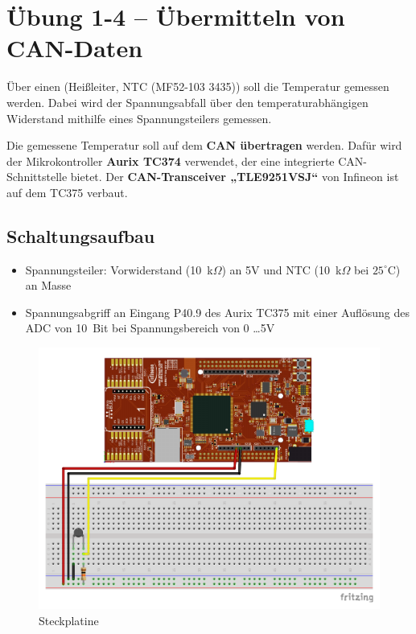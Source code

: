 \documentclass[
    fontsize=12pt,                      %
    paper=a4,                           %
    twoside=off,                       %
    DIV=15,                             %
    BCOR=12mm,                          %
    headings=normal,                    %
    headsepline=false,                   %
    footsepline=false,                  %
    headinclude=true,                   %
    footinclude=false,                  %
    toc=listof,                         %
    toc=bib,                            %
    chapterprefix=false,                %
    appendixprefix=false,               %
    numbers=noendperiod,                %
    captions=tableabove,                %
    footnotes=multiple,                 %
    bibliography=oldstyle,              %
    draft=false,                        %
]{scrreprt}
\begin{document}
\chapter*{Übung 1-4 -- Übermitteln von CAN-Daten}

Über einen  (Heißleiter, NTC (MF52-103 3435)) soll die Temperatur gemessen werden. Dabei wird der Spannungsabfall über den temperaturabhängigen Widerstand mithilfe eines Spannungsteilers gemessen.

\vskip 0.2cm
\noindent

Die gemessene Temperatur soll auf dem \textbf{CAN übertragen} werden. Dafür wird der Mikrokontroller \textbf{Aurix TC374} verwendet, der eine integrierte CAN-Schnittstelle bietet. Der \textbf{CAN-Transceiver „TLE9251VSJ“} von Infineon ist auf dem TC375 verbaut.

\vskip 0.2cm
\noindent


\vskip 0.5cm
\section*{Schaltungsaufbau} 
\begin{itemize}
\item Spannungsteiler: Vorwiderstand (10~k$\Omega$) an 5V und NTC (10~k$\Omega$ bei $25^\circ$C) an Masse
\item Spannungsabgriff an Eingang P40.9 des Aurix TC375 mit einer Auflösung des ADC von 10~Bit bei Spannungsbereich von 0 \dots 5V
\end{itemize}

\begin{figure}[H]
  \centering
  \includegraphics[width=0.55\linewidth]{Fritzing/Uebung_104_Steckplatine.pdf}
  \caption{Steckplatine}%
\end{figure}
\end{document}
